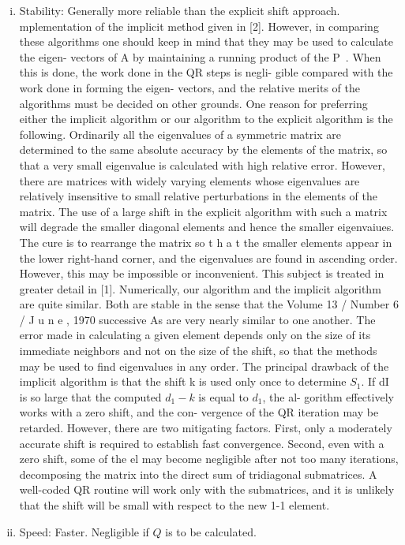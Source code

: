 \begin{enumerate}[(i):]
\item Stability: Generally more reliable than the explicit shift approach.
mplementation of the implicit method given in [2].
However, in comparing these algorithms one should
keep in mind that they may be used to calculate the eigen-
vectors of A by maintaining a running product of the P~.
When this is done, the work done in the QR steps is negli-
gible compared with the work done in forming the eigen-
vectors, and the relative merits of the algorithms must be
decided on other grounds.
One reason for preferring either the implicit algorithm
or our algorithm to the explicit algorithm is the following.
Ordinarily all the eigenvalues of a symmetric matrix are
determined to the same absolute accuracy by the elements
of the matrix, so that a very small eigenvalue is calculated
with high relative error. However, there are matrices with
widely varying elements whose eigenvalues are relatively
insensitive to small relative perturbations in the elements
of the matrix. The use of a large shift in the explicit
algorithm with such a matrix will degrade the smaller
diagonal elements and hence the smaller eigenvaiues.
The cure is to rearrange the matrix so t h a t the smaller
elements appear in the lower right-hand corner, and the
eigenvalues are found in ascending order. However, this
may be impossible or inconvenient. This subject is treated
in greater detail in [1].
Numerically, our algorithm and the implicit algorithm
are quite similar. Both are stable in the sense that the
Volume 13 / Number 6 / J u n e , 1970
successive As are very nearly similar to one another. The
error made in calculating a given element depends only
on the size of its immediate neighbors and not on the size
of the shift, so that the methods may be used to find
eigenvalues in any order.
The principal drawback of the implicit algorithm is that
the shift k is used only once to determine $S_1$. If dI is
so large that the computed $d_1 - k$ is equal to $d_1$, the al-
gorithm effectively works with a zero shift, and the con-
vergence of the QR iteration may be retarded. However,
there are two mitigating factors. First, only a moderately
accurate shift is required to establish fast convergence.
Second, even with a zero shift, some of the el may become
negligible after not too many iterations, decomposing the
matrix into the direct sum of tridiagonal submatrices. A
well-coded QR routine will work only with the submatrices,
and it is unlikely that the shift will be small with respect
to the new 1-1 element.
	
\item Speed: Faster. Negligible if $Q$ is to be calculated.
\end{enumerate}
